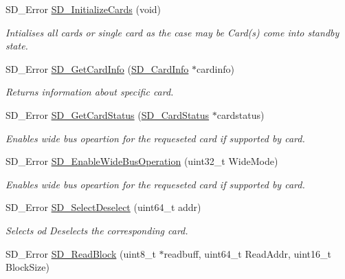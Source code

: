 \begin{DoxyCompactItemize}
S\+D\+\_\+\+Error \hyperlink{group___s_t_m324x_g___e_v_a_l___s_d_i_o___s_d___exported___functions_gab39f671413ee824a13bf1bd833f724e9}{S\+D\+\_\+\+Initialize\+Cards} (void)
\begin{DoxyCompactList}\small\item\em Intialises all cards or single card as the case may be Card(s) come into standby state. \end{DoxyCompactList}\item 
S\+D\+\_\+\+Error \hyperlink{group___s_t_m324x_g___e_v_a_l___s_d_i_o___s_d___exported___functions_ga5348c3c8f17f8c704bf00f1c5e21549d}{S\+D\+\_\+\+Get\+Card\+Info} (\hyperlink{struct_s_d___card_info}{S\+D\+\_\+\+Card\+Info} $\ast$cardinfo)
\begin{DoxyCompactList}\small\item\em Returns information about specific card. \end{DoxyCompactList}\item 
S\+D\+\_\+\+Error \hyperlink{group___s_t_m324x_g___e_v_a_l___s_d_i_o___s_d___exported___functions_ga858e0742dd01b2e2f6f397d30de6428f}{S\+D\+\_\+\+Get\+Card\+Status} (\hyperlink{struct_s_d___card_status}{S\+D\+\_\+\+Card\+Status} $\ast$cardstatus)
\begin{DoxyCompactList}\small\item\em Enables wide bus opeartion for the requeseted card if supported by card. \end{DoxyCompactList}\item 
S\+D\+\_\+\+Error \hyperlink{group___s_t_m324x_g___e_v_a_l___s_d_i_o___s_d___exported___functions_ga6569e73a229e639d2043549942d58d11}{S\+D\+\_\+\+Enable\+Wide\+Bus\+Operation} (uint32\+\_\+t Wide\+Mode)
\begin{DoxyCompactList}\small\item\em Enables wide bus opeartion for the requeseted card if supported by card. \end{DoxyCompactList}\item 
S\+D\+\_\+\+Error \hyperlink{group___s_t_m324x_g___e_v_a_l___s_d_i_o___s_d___exported___functions_ga849eb0b385337453139a7567898dacb7}{S\+D\+\_\+\+Select\+Deselect} (uint64\+\_\+t addr)
\begin{DoxyCompactList}\small\item\em Selects od Deselects the corresponding card. \end{DoxyCompactList}\item 
S\+D\+\_\+\+Error \hyperlink{group___s_t_m324x_g___e_v_a_l___s_d_i_o___s_d___exported___functions_ga1b2b4c1bf25da0771325b00cd638129d}{S\+D\+\_\+\+Read\+Block} (uint8\+\_\+t $\ast$readbuff, uint64\+\_\+t Read\+Addr, uint16\+\_\+t Block\+Size)

\end{DoxyCompactItemize}
